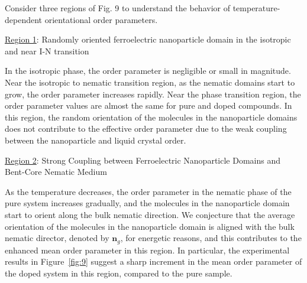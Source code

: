 \documentclass[reprint,amsfonts,amsmath,amssymb,aps,pre,floatfix,10pt]{revtex4-1}
\begin{document}
Consider three regions of Fig. 9 to understand the behavior of temperature-dependent orientational order parameters.

\underline{Region 1}: Randomly oriented ferroelectric nanoparticle domain in the isotropic and near I-N transition

In the isotropic phase, the order parameter is negligible or small in magnitude. Near the isotropic to nematic transition region, as the nematic domains start to grow, the order parameter increases rapidly. Near the phase transition region, the order parameter values are almost the same for pure and doped compounds. In this region, the random orientation of the molecules in the nanoparticle domains does not contribute to the effective order parameter due to the weak coupling between the nanoparticle and liquid crystal order. 

\underline{Region 2}: Strong Coupling between Ferroelectric Nanoparticle Domains and Bent-Core Nematic Medium %

As the temperature decreases, the order parameter in the nematic phase of the pure system increases gradually, and the molecules in the nanoparticle domain start to orient along the bulk nematic direction.  
We conjecture that the average orientation of the molecules in the nanoparticle domain is aligned with the bulk nematic director, denoted by $\mathbf{n}_g$, for energetic reasons, and this contributes to the enhanced mean order parameter in this region. In particular, the experimental results in Figure~\ref{fig:9} suggest a sharp increment in the mean order parameter of the doped system in this region, compared to the pure sample.
\end{document}
